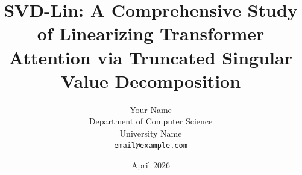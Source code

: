 \title{SVD-Lin: A Comprehensive Study of Linearizing Transformer Attention via Truncated Singular Value Decomposition}

\author{
    Your Name \\
    Department of Computer Science\\
    University Name\\
    \texttt{email@example.com}
}

\date{April 2026}